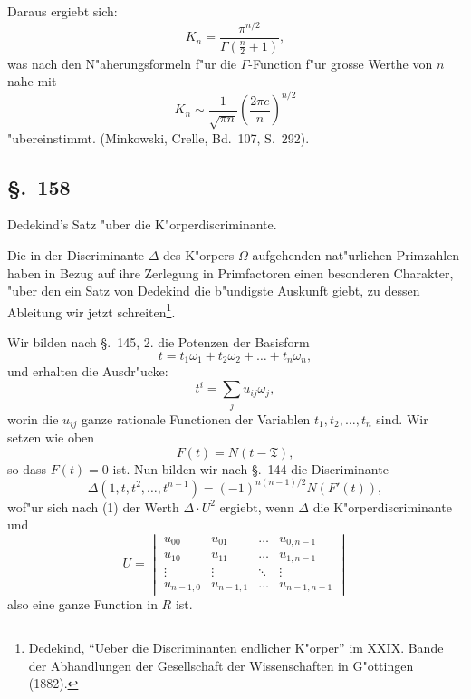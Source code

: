 \documentclass[12pt,a4paper]{article}
\theoremstyle{definition}
\begin{document}
Daraus ergiebt sich:
\begin{equation}
K_n = \frac{\pi^{n/2}}{\Gamma(\frac{n}{2}+1)},
\end{equation}
was nach den N"aherungsformeln f"ur die $\Gamma$-Function f"ur grosse Werthe von $n$ nahe mit
\begin{equation}
K_n \sim \frac{1}{\sqrt{\pi n}} \left(\frac{2\pi e}{n}\right)^{n/2}
\end{equation}
"ubereinstimmt. (Minkowski, Crelle, Bd.~107, S.~292).

\subsection*{\S.~158}

Dedekind's Satz "uber die K"orperdiscriminante.

Die in der Discriminante $\Delta$ des K"orpers $\Omega$ aufgehenden nat"urlichen Primzahlen haben in Bezug auf ihre Zerlegung in Primfactoren einen besonderen Charakter, "uber den ein Satz von Dedekind die b"undigste Auskunft giebt, zu dessen Ableitung wir jetzt schreiten\footnote{Dedekind, ``Ueber die Discriminanten endlicher K"orper'' im XXIX. Bande der Abhandlungen der Gesellschaft der Wissenschaften in G"ottingen (1882).}.

Wir bilden nach \S.~145, 2. die Potenzen der Basisform
\begin{equation}
t = t_1\omega_1 + t_2\omega_2 + \dots + t_n\omega_n,
\end{equation}
und erhalten die Ausdr"ucke:
\begin{equation}
t^i = \sum_j u_{ij}\omega_j,
\end{equation}
worin die $u_{ij}$ ganze rationale Functionen der Variablen $t_1, t_2, \dots, t_n$ sind. Wir setzen wie oben
\begin{equation}
F(t) = N(t - \mathfrak{T}),
\end{equation}
so dass $F(t) = 0$ ist. Nun bilden wir nach \S.~144 die Discriminante
\begin{equation}
\Delta(1, t, t^2, \dots, t^{n-1}) = (-1)^{n(n-1)/2} N(F'(t)),
\end{equation}
wof"ur sich nach (1) der Werth $\Delta \cdot U^2$ ergiebt, wenn $\Delta$ die K"orperdiscriminante und
\begin{equation}
U = \begin{vmatrix}
u_{00} & u_{01} & \dots & u_{0,n-1} \\
u_{10} & u_{11} & \dots & u_{1,n-1} \\
\vdots & \vdots & \ddots & \vdots \\
u_{n-1,0} & u_{n-1,1} & \dots & u_{n-1,n-1}
\end{vmatrix}
\end{equation}
also eine ganze Function in $R$ ist.
\end{document}

